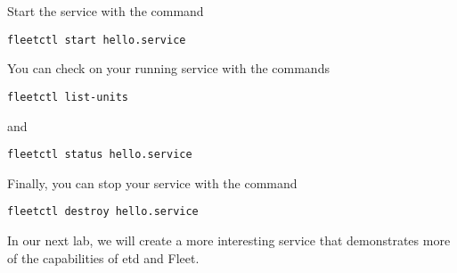 \documentclass{article}
\begin{document}
Start the service with the command

\texttt{fleetctl start hello.service}

You can check on your running service with the commands

\texttt{fleetctl list-units}

and

\texttt{fleetctl status hello.service} 

Finally, you can stop your service with the command

\texttt{fleetctl destroy hello.service}

In our next lab, we will create a more interesting service that demonstrates more of the capabilities of etd and Fleet.
\end{document}
